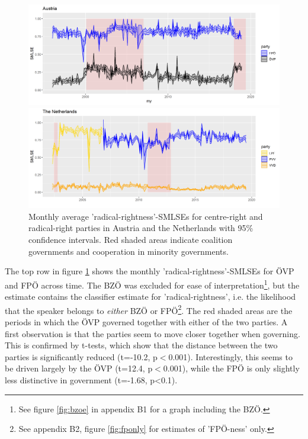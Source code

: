 \documentclass{article}
\begin{document}
\begin{figure}
\begin{minipage}{\textwidth}
\includegraphics[width=\linewidth]{AT/vis/AT_fpvp_paper.png}
\end{minipage}
\hfill
\begin{minipage}{\textwidth}
\includegraphics[width=\linewidth]{NL/vis/nl_vvd_rr_paper.png}
\end{minipage}
\caption{Monthly average 'radical-rightness'-SMLSEs for centre-right and radical-right parties in Austria and the Netherlands with 95\% confidence intervals. Red shaded areas indicate coalition governments and cooperation in minority governments.}
\label{fig:govs}
\end{figure}

The top row in figure \ref{fig:govs} shows the monthly 'radical-rightness'-SMLSEs for ÖVP and FPÖ across time. The BZÖ was excluded for ease of interpretation\footnote{See figure \ref{fig:bzoe} in appendix B1 for a graph including the BZÖ.}, but the estimate contains the classifier estimate for 'radical-rightness', i.e. the likelihood that the speaker belongs to \textit{either} BZÖ or FPÖ\footnote{See appendix B2, figure \ref{fig:fponly} for estimates of 'FPÖ-ness' only.}. The red shaded areas are the periods in which the ÖVP governed together with either of the two parties. A first observation is that the parties seem to move closer together when governing. This is confirmed by t-tests, which show that the distance between the two parties is significantly reduced (t=-10.2, p$<$0.001). Interestingly, this seems to be driven largely by the ÖVP (t=12.4, p$<$0.001), while the FPÖ is only slightly less distinctive in government (t=-1.68, p<0.1). \par
\end{document}
